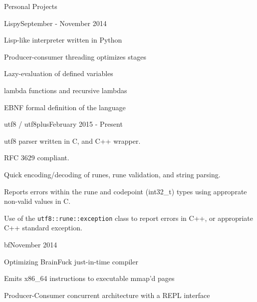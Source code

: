 \documentclass{resume} %
\begin{document}
\clearpage

\begin{rSection}{Personal Projects}

\begin{rSubsection}{Lispy}{September - November 2014}{}{}

	\item Lisp-like interpreter written in Python
	\item Producer-consumer threading optimizes stages
	\item Lazy-evaluation of defined variables
	\item lambda functions and recursive lambdas
	\item EBNF formal definition of the language
\end{rSubsection}

\begin{rSubsection}{utf8 / utf8plus}{February 2015 - Present}{}{}

	\item utf8 parser written in C, and C++ wrapper.
	\item RFC 3629 compliant.
	\item Quick encoding/decoding of runes, rune validation, and string parsing.
	\item Reports errors within the rune and codepoint (int32\_t) types using approprate non-valid values in C.
	\item Use of the \verb!utf8::rune::exception! class to report errors in C++, or appropriate C++ standard exception.
\end{rSubsection}

\begin{rSubsection}{bf}{November 2014}{}{}

	\item Optimizing BrainFuck just-in-time compiler
	\item Emits x86\_64 instructions to executable mmap'd pages
	\item Producer-Consumer concurrent architecture with a REPL interface
\end{rSubsection}

\end{rSection}

\end{document}
